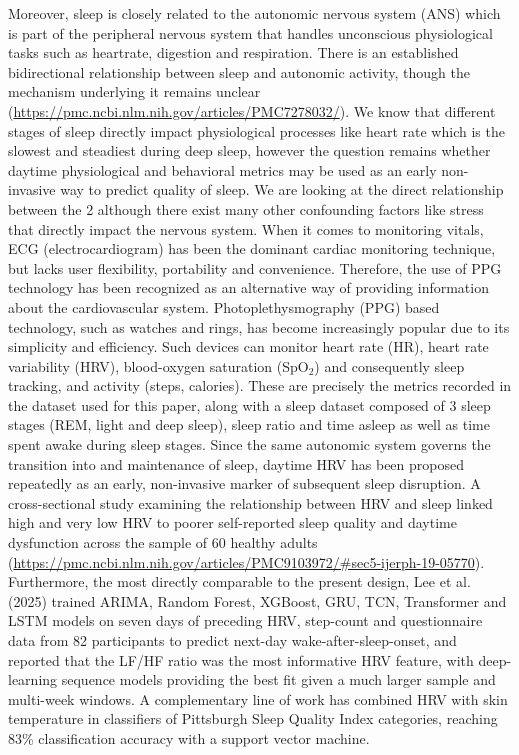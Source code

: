 \documentclass[fleqn,10pt]{wlscirep}
\begin{document}
Moreover, sleep is closely related to the autonomic nervous system (ANS) which is part of the peripheral nervous system that handles unconscious physiological tasks such as heartrate, digestion and respiration. There is an established bidirectional relationship between sleep and autonomic activity, though the mechanism underlying it remains unclear (\url{https://pmc.ncbi.nlm.nih.gov/articles/PMC7278032/}). We know that different stages of sleep directly impact physiological processes like heart rate which is the slowest and steadiest during deep sleep, however the question remains whether daytime physiological and behavioral metrics may be used as an early non-invasive way to predict quality of sleep. We are looking at the direct relationship between the 2 although there exist many other confounding factors like stress that directly impact the nervous system. When it comes to monitoring vitals, ECG (electrocardiogram) has been the dominant cardiac monitoring technique, but lacks user flexibility, portability and convenience. Therefore, the use of PPG technology has been recognized as an alternative way of providing information about the cardiovascular system. Photoplethysmography (PPG) based technology, such as watches and rings, has become increasingly popular due to its simplicity and efficiency. Such devices can monitor heart rate (HR), heart rate variability (HRV), blood-oxygen saturation (SpO$_2$) and consequently sleep tracking, and activity (steps, calories). These are precisely the metrics recorded in the dataset used for this paper, along with a sleep dataset composed of 3 sleep stages (REM, light and deep sleep), sleep ratio and time asleep as well as time spent awake during sleep stages. Since the same autonomic system governs the transition into and maintenance of sleep, daytime HRV has been proposed repeatedly as an early, non-invasive marker of subsequent sleep disruption. A cross-sectional study examining the relationship between HRV and sleep linked high and very low HRV to poorer self-reported sleep quality and daytime dysfunction across the sample of 60 healthy adults (\url{https://pmc.ncbi.nlm.nih.gov/articles/PMC9103972/#sec5-ijerph-19-05770}). Furthermore, the most directly comparable to the present design, Lee et al. (2025) trained ARIMA, Random Forest, XGBoost, GRU, TCN, Transformer and LSTM models on seven days of preceding HRV, step-count and questionnaire data from 82 participants to predict next-day wake-after-sleep-onset, and reported that the LF/HF ratio was the most informative HRV feature, with deep-learning sequence models providing the best fit given a much larger sample and multi-week windows. A complementary line of work has combined HRV with skin temperature in classifiers of Pittsburgh Sleep Quality Index categories, reaching 83\% classification accuracy with a support vector machine.
\end{document}
